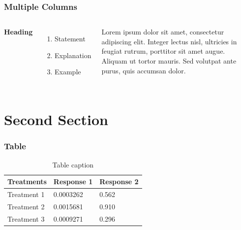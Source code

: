 \documentclass{beamer}
\begin{document}

\begin{frame}
  \frametitle{Multiple Columns}
  \begin{columns}[c] %

    \textbf{Heading}
    \begin{enumerate}
    \item Statement
    \item Explanation
    \item Example
    \end{enumerate}

    Lorem ipsum dolor sit amet, consectetur adipiscing elit. Integer lectus nisl, ultricies in feugiat rutrum, porttitor sit amet augue. Aliquam ut tortor mauris. Sed volutpat ante purus, quis accumsan dolor.

  \end{columns}
\end{frame}

\section{Second Section}

\begin{frame}
  \frametitle{Table}
  \begin{table}
    \begin{tabular}{l l l}
      \toprule
      \textbf{Treatments} & \textbf{Response 1} & \textbf{Response 2}\\
      \midrule
      Treatment 1 & 0.0003262 & 0.562 \\
      Treatment 2 & 0.0015681 & 0.910 \\
      Treatment 3 & 0.0009271 & 0.296 \\
      \bottomrule
    \end{tabular}
    \caption{Table caption}
  \end{table}
\end{frame}
\end{document}
